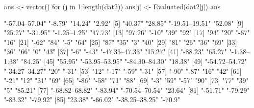 \documentclass[11pt]{article}\usepackage[]{graphicx}\usepackage[]{color}
\begin{document}
\begin{Schunk}
\begin{Sinput}
ans <- vector()
for (j in 1:length(dat2)) {
    ans[j] <- Evaluated(dat2[j])
}
ans
\end{Sinput}
\begin{Soutput}
 [1] "-57.04--57.04" "-8.79"         "14.24"         "2.92"         
 [5] "40.37"         "28.85"         "-19.51--19.51" "52.08"        
 [9] "25.27"         "-31.95"        "-1.25--1.25"   "47.73"        
[13] "97.26"         "-10"           "39"            "92"           
[17] "94"            "20"            "-67"           "16"           
[21] "-62"           "84"            "-5"            "64"           
[25] "87"            "35"            "3"             "40"           
[29] "81"            "26"            "36"            "69"           
[33] "36"            "66"            "0"             "43"           
[37] "-6"            "-43"           "-47.33--47.33" "15.27"        
[41] "-88.23"        "65.27"         "-1.38--1.38"   "84.25"        
[45] "55.95"         "-53.95--53.95" "-84.30--84.30" "18.38"        
[49] "-54.72--54.72" "-34.27--34.27" "20"            "-31"          
[53] "12"            "-17"           "-59"           "-31"          
[57] "-90"           "-87"           "16"            "42"           
[61] "-21"           "12"            "31"            "69"           
[65] "-86"           "-58"           "71"            "88"           
[69] "-3"            "59"            "-57"           "90"           
[73] "77"            "39"            "5"             "85.21"        
[77] "-68.82--68.82" "-83.94"        "-70.54--70.54" "23.64"        
[81] "-51.71"        "-79.29"        "-83.32"        "-79.92"       
[85] "23.38"         "-66.02"        "-38.25--38.25" "-70.9"        
\end{Soutput}
\end{Schunk}
\end{document}
